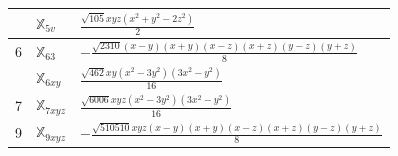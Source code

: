 \documentclass[fleqn,9pt,landscape]{jsarticle}
\begin{document}
\begin{longtable}{cll}
 & $\mathbb{X}_{5v}$ & $\frac{\sqrt{105} x y z \left(x^{2} + y^{2} - 2 z^{2}\right)}{2}$ \\ \hline
6 & $\mathbb{X}_{63}$ & $- \frac{\sqrt{2310} \left(x - y\right) \left(x + y\right) \left(x - z\right) \left(x + z\right) \left(y - z\right) \left(y + z\right)}{8}$ \\
 & $\mathbb{X}_{6xy}$ & $\frac{\sqrt{462} x y \left(x^{2} - 3 y^{2}\right) \left(3 x^{2} - y^{2}\right)}{16}$ \\ \hline
7 & $\mathbb{X}_{7xyz}$ & $\frac{\sqrt{6006} x y z \left(x^{2} - 3 y^{2}\right) \left(3 x^{2} - y^{2}\right)}{16}$ \\ \hline
9 & $\mathbb{X}_{9xyz}$ & $- \frac{\sqrt{510510} x y z \left(x - y\right) \left(x + y\right) \left(x - z\right) \left(x + z\right) \left(y - z\right) \left(y + z\right)}{8}$ \\
\end{longtable}
\end{document}
